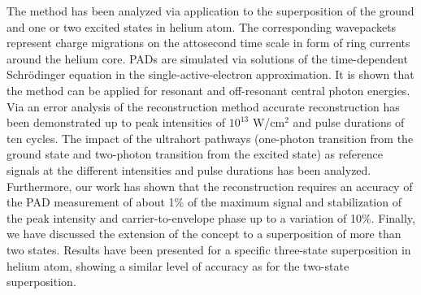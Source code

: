The method has been analyzed via application to the superposition of the ground and one or two excited states in helium atom. The corresponding wavepackets represent charge migrations on the attosecond time scale in form of ring currents around the helium core. PADs are simulated via solutions of the time-dependent Schr\"odinger equation in the single-active-electron approximation. It is shown that the method can be applied for resonant and off-resonant central photon energies. Via an error analysis of the reconstruction method accurate reconstruction has been demonstrated up to peak intensities of $10^{13}$ W/cm$^2$ and pulse durations of ten cycles. The impact of the ultrahort pathways (one-photon transition from the ground state and two-photon transition from the excited state) as reference signals at the different intensities and pulse durations has been analyzed. Furthermore, our work has shown that the reconstruction requires an accuracy of the PAD measurement of about 1\% of the maximum signal and stabilization of the peak intensity and carrier-to-envelope phase up to a variation of 10\%. Finally, we have discussed the extension of the concept to a superposition of more than two states. Results have been presented for a specific three-state superposition in helium atom, showing a similar level of accuracy as for the two-state superposition. 

